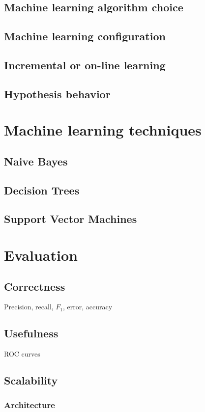 \subsection{Machine learning algorithm choice}

\subsection{Machine learning configuration}

\subsection{Incremental or on-line learning}

\subsection{Hypothesis behavior}
\label{Hypothesis behavior}

\section{Machine learning techniques}
\subsection{Naive Bayes}
\subsection{Decision Trees}
\subsection{Support Vector Machines}

\section{Evaluation}
\subsection{Correctness}
Precision, recall, $F_1$, error, accuracy
\subsection{Usefulness}
ROC curves
\subsection{Scalability}
\subsubsection{Architecture}
